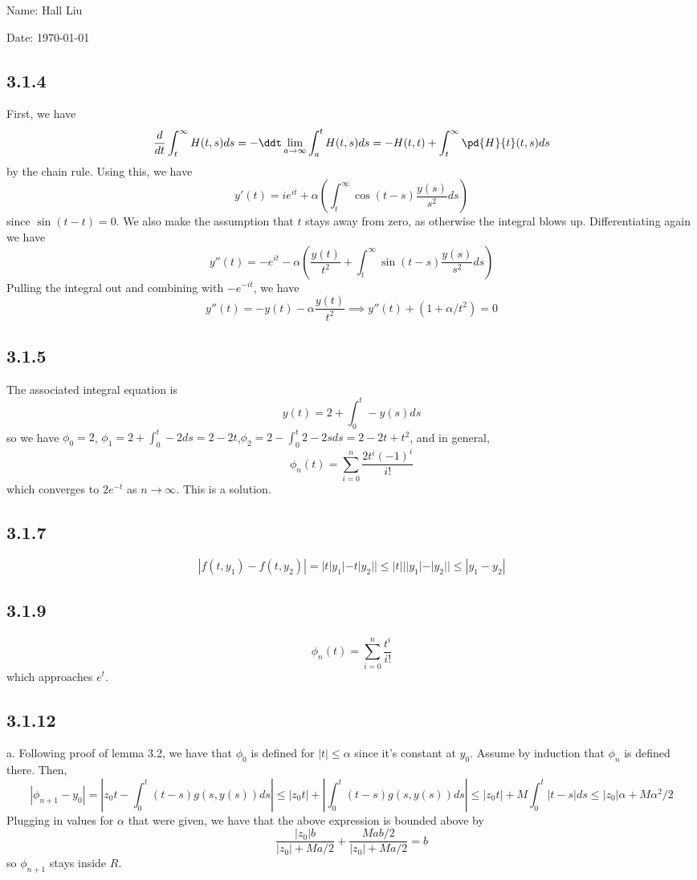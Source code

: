 \documentclass{article}
\begin{document}
Name: Hall Liu

Date: \today 
\vspace{1.5cm}

\subsection*{3.1.4}
First, we have 
$$\frac{d}{dt}\int_t^\infty H(t,s)ds=-\ddt\lim_{a\to\infty}\int_a^tH(t,s)ds=-H(t,t)+\int_t^\infty\pd{H}{t}(t,s)ds$$
by the chain rule. Using this, we have 
$$y'(t)=ie^{it}+\alpha\left(\int_t^\infty\cos(t-s)\frac{y(s)}{s^2}ds\right)$$
since $\sin(t-t)=0$. We also make the assumption that $t$ stays away from zero, as otherwise the integral blows up. Differentiating again we have
$$y''(t)=-e^{it}-\alpha\left(\frac{y(t)}{t^2}+\int_t^\infty\sin(t-s)\frac{y(s)}{s^2}ds\right)$$
Pulling the integral out and combining with $-e^{-it}$, we have 
$$y''(t)=-y(t)-\alpha\frac{y(t)}{t^2}\implies y''(t)+(1+\alpha/t^2)=0$$
\subsection*{3.1.5}
The associated integral equation is 
$$y(t)=2+\int_0^t-y(s)ds$$
so we have $\phi_0=2$, $\phi_1=2+\int_0^t-2ds=2-2t$,$\phi_2=2-\int_0^t2-2sds=2-2t+t^2$, and in general,
$$\phi_n(t)=\sum_{i=0}^n\frac{2t^i(-1)^i}{i!}$$
which converges to $2e^{-t}$ as $n\to\infty$. This is a solution.
\subsection*{3.1.7}
$$|f(t,y_1)-f(t,y_2)|=|t|y_1|-t|y_2||\leq |t|||y_1|-|y_2||\leq |y_1-y_2|$$
\subsection*{3.1.9}
$$\phi_n(t)=\sum_{i=0}^n\frac{t^i}{i!}$$
which approaches $e^t$.
\subsection*{3.1.12}
a. Following proof of lemma 3.2, we have that $\phi_0$ is defined for $|t|\leq\alpha$ since it's constant at $y_0$. Assume by induction that $\phi_n$ is defined there. Then,
$$|\phi_{n+1}-y_0|=\left|z_0t-\int_0^t(t-s)g(s,y(s))ds\right|\leq |z_0t|+\left|\int_0^t(t-s)g(s,y(s))ds\right|\leq|z_0t|+M\int_0^t|t-s|ds\leq|z_0|\alpha+M\alpha^2/2$$
Plugging in values for $\alpha$ that were given, we have that the above expression is bounded above by
$$\frac{|z_0|b}{|z_0|+Ma/2}+\frac{Mab/2}{|z_0|+Ma/2}=b$$
so $\phi_{n+1}$ stays inside $R$.
\end{document}
